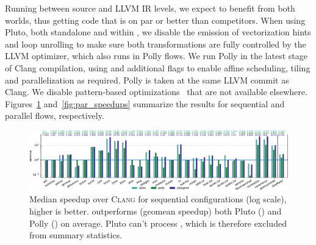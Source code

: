 Running between source and LLVM IR levels, we expect \tool to benefit from both worlds, thus getting code that is on par or better than competitors. When using Pluto, both standalone and within \tool, we disable the emission of vectorization hints and loop unrolling to make sure both transformations are fully controlled by the LLVM optimizer, which also runs in Polly flows. We run Polly in the latest stage of Clang compilation, using  and additional flags to enable affine scheduling, tiling and parallelization as required. Polly is taken at the same LLVM commit as Clang. We disable pattern-based optimizations~\cite{gareev_polly} that are not available elsewhere.
Figures~\ref{fig:seq_speedups} and~\ref{fig:par_speedups} summarize the results for sequential and parallel flows, respectively.

\begin{figure}
  \centering
  \includegraphics[width=\textwidth]{images/seq_speedups.pdf}
  \caption{Median speedup over \textsc{Clang} for sequential configurations (log scale), higher is better. \tool outperforms  (\toolseqspeedup geomean speedup) both Pluto (\plutoseqspeedup) and Polly (\pollyseqspeedup) on average. Pluto can't process , which is therefore excluded from summary statistics.}
  \label{fig:seq_speedups}
\end{figure}

